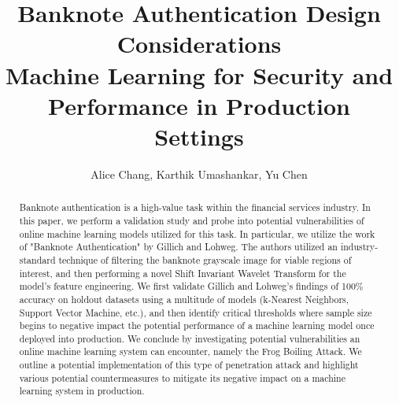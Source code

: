 \documentclass{article}
\begin{document}
\title{%
  \textbf{Banknote Authentication Design Considerations} \\
  \large Machine Learning for Security and  \\
    Performance in Production Settings}
\author{Alice Chang, Karthik Umashankar, Yu Chen}
\maketitle

\begin{abstract}
Banknote authentication is a high-value task within the financial services industry. In this paper, we perform a validation study and probe into potential vulnerabilities of online machine learning models utilized for this task. In particular, we utilize the work of "Banknote Authentication" by Gillich and Lohweg\cite{original_paper}. The authors utilized an industry-standard technique of filtering the banknote grayscale image for viable regions of interest, and then performing a novel Shift Invariant Wavelet Transform for the model's feature engineering. We first validate Gillich and Lohweg's findings of 100\% accuracy on holdout datasets using a multitude of models (k-Nearest Neighbors, Support Vector Machine, etc.), and then identify critical thresholds where sample size begins to negative impact the potential performance of a machine learning model once deployed into production.
\newline\newline
We conclude by investigating potential vulnerabilities an online machine learning system can encounter, namely the Frog Boiling Attack. We outline a potential implementation of this type of penetration attack and highlight various potential countermeasures to mitigate its negative impact on a machine learning system in production.
\end{abstract}
\end{document}
